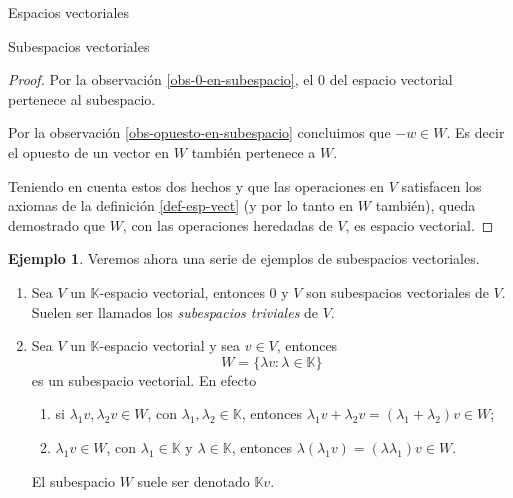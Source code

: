 \documentclass[a4paper,12pt,twoside,spanish,reqno]{amsbook}
\theoremstyle{definition}
\newtheorem{ejemplo}{Ejemplo}[section]
\theoremstyle{remark}
\newcommand{\K}{\mathbb K}
\begin{document}
\begin{chapter}{Espacios vectoriales}
\begin{section}{Subespacios vectoriales}
\begin{proof}
        Por la observación \ref{obs-0-en-subespacio}, el $0$ del espacio vectorial pertenece al subespacio. 
        
       Por la observación  \ref{obs-opuesto-en-subespacio} concluimos que $-w\in W$. Es decir el opuesto de un vector en $W$ también pertenece a $W$. 
        
        Teniendo en cuenta estos dos hechos y que las operaciones en $V$ satisfacen los axiomas de la definición \ref{def-esp-vect} (y por lo tanto en $W$ también),  queda demostrado que $W$, con las operaciones heredadas de $V$, es espacio vectorial.  
    \end{proof}



\begin{ejemplo} Veremos ahora una serie de ejemplos de subespacios vectoriales.
    \begin{enumerate}
        \item Sea $V$ un $\K$-espacio vectorial, entonces $0$ y $V$ son subespacios vectoriales de $V$. Suelen ser llamados los \textit{subespacios triviales} de $V$.
        
        \item Sea $V$ un $\K$-espacio vectorial y sea $v \in V$, entonces
        $$
        W = \{\lambda v: \lambda \in \K \}
        $$
        es un subespacio vectorial. En  efecto
        \begin{enumerate}
            \item si $\lambda_1v,\lambda_2v \in W$, con $\lambda_1,\lambda_2 \in \K$,  entonces $\lambda_1v + \lambda_2v = (\lambda_1+\lambda_2)v \in W$;
            \item  $\lambda_1v \in W$, con $\lambda_1 \in \K$ y $\lambda \in \K$,  entonces $\lambda(\lambda_1v) = (\lambda \lambda_1)v \in W$.
        \end{enumerate}
        El subespacio $W$ suele ser denotado $\K v$.
    

\end{enumerate}
\end{ejemplo}
\end{section}
\end{chapter}
\end{document}
